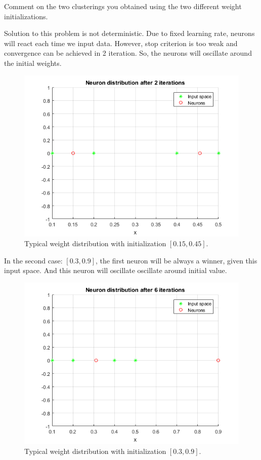\documentclass[a4paper, 12pt]{article}
\begin{document}
Comment on the two clusterings you obtained using the two different weight initializations.

\bigskip
\newpage
Solution to this problem is not deterministic. Due to fixed learning rate, neurons will react each time we input data. However, stop criterion is too weak and convergence can be achieved in 2 iteration. So, the neurons will oscillate around the initial weights.

\begin{figure}[h]
  \centering
  \caption{Typical weight distribution with initialization $[0.15, 0.45]$.}
  \includegraphics[scale = 0.7]{1}
\end{figure}

In the second case: $[0.3, 0.9]$, the first neuron will be always a winner, given this input space. And this neuron will oscillate oscillate around initial value.

\begin{figure}[h]
  \centering
  \caption{Typical weight distribution with initialization $[0.3, 0.9]$.}
  \includegraphics[scale = 0.7]{4}
\end{figure}
\end{document}

